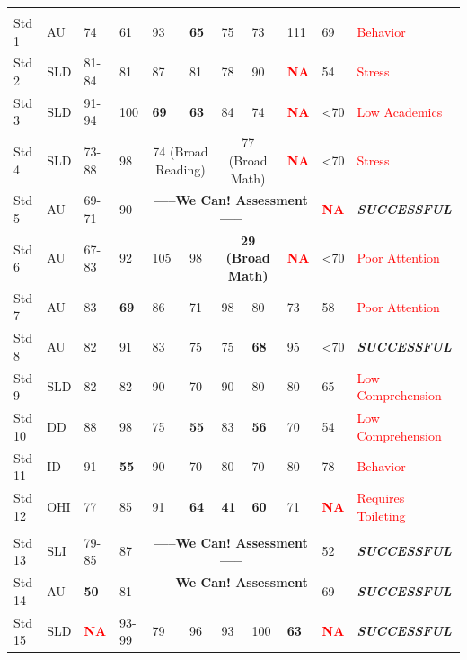 \documentclass[twoside]{article}
\begin{document}
\begin{tiny}
\begin{landscape}
\begin{longtable}{p{1.5cm}p{1.5cm}p{1.5cm}p{1.5cm}p{1.75cm}p{1.75cm}p{1.75cm}p{1.75cm}p{1.75cm}p{1.75cm}p{2.5cm}@{}}
			\endfoot
			\hline \hline
			\endlastfoot
%
\multicolumn {5}{l}{Schools 1-4 - Mild/Moderate Academic Units}& & & & & &\\
\cmidrule(lr){1-2}
Std 1 & AU & 74 & 61 & 93 & \textbf{65} & 75 & 73 & 111 & 69 & \textcolor{red}{Behavior}\\
Std 2 & SLD & 81-84 & 81 & 87 & 81 & 78 & 90 & \textcolor{red}{\textbf{NA}} & 54 & \textcolor{red}{Stress}\\
Std 3 & SLD & 91-94 & 100 & \textbf{69} & \textbf{63} & 84 & 74 & \textcolor{red}{\textbf{NA}} & \textless70 & \textcolor{red}{Low Academics}\\
Std 4 & SLD & 73-88 & 98 & \multicolumn{2}{c}{74 (Broad Reading)} & \multicolumn {2}{c}{77 (Broad Math)} & \textcolor{red}{\textbf{NA}} & \textless70 & \textcolor{red}{Stress}\\
Std 5 & AU & 69-71 & 90 & \multicolumn{5}{c}{\textbf{-----We Can! Assessment-----}} & \textcolor{red}{\textbf{NA}} & \textbf{\textit{\textbf{\textit{SUCCESSFUL}}}}\\
Std 6 & AU & 67-83 & 92 & 105 & 98 & \multicolumn{2}{c}{\textbf{29 (Broad Math)}} & \textcolor{red}{\textbf{NA}} & \textless70 & \textcolor{red}{Poor Attention}\\
Std 7 & AU & 83 & \textbf{69} & 86 & 71 & 98 & 80 & 73 & 58 & \textcolor{red}{Poor Attention}\\ 
Std 8 & AU & 82 & 91 & 83 & 75 & 75 & \textbf{68} & 95 & \textless70 & \textbf{\textit{SUCCESSFUL}}\\ 
Std 9 & SLD & 82 & 82 & 90 & 70 & 90 & 80 & 80 & 65 & \textcolor{red}{Low Comprehension}\\ 
Std 10 & DD & 88 & 98 & 75 & \textbf{55} & 83 & \textbf{56} & 70 & 54 & \textcolor{red}{Low Comprehension}\\
Std 11 & ID & 91 & \textbf{55} & 90 & 70 & 80 & 70 & 80 & 78 & \textcolor{red}{Behavior}\\
Std 12 & OHI & 77 & 85 & 91 & \textbf{64} & \textbf{41} & \textbf{60} & 71 & \textcolor{red}{\textbf{NA}} & \textcolor{red}{Requires Toileting}\\
%
\hline\\
Std 13 & SLI & 79-85 & 87 & \multicolumn{5}{c}{\textbf{-----We Can! Assessment-----}} & 52 & \textbf{\textit{SUCCESSFUL}} \\
Std 14 & AU & \textbf{50}& 81 & \multicolumn{5}{c}{\textbf{-----We Can! Assessment-----}} & 69 & \textbf{\textit{SUCCESSFUL}} \\
Std 15 & SLD & \textcolor{red}{\textbf{NA}} & 93-99 & 79 & 96 & 93 & 100 & \textbf{63} & \textcolor{red}{\textbf{NA}} & \textbf{\textit{SUCCESSFUL}} \\

\end{longtable}
\end{landscape}
\end{tiny}
\end{document}

